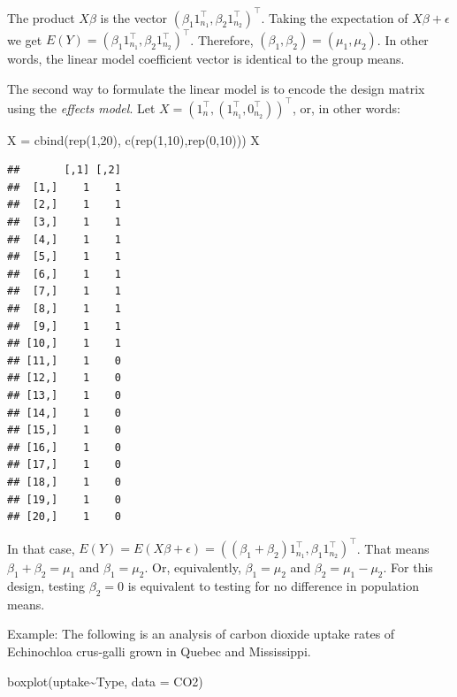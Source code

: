 \documentclass[
]{book}
\newenvironment{Shaded}{\begin{snugshade}}{\end{snugshade}}
\newcommand{\AttributeTok}[1]{\textcolor[rgb]{0.77,0.63,0.00}{#1}}
\newcommand{\DecValTok}[1]{\textcolor[rgb]{0.00,0.00,0.81}{#1}}
\newcommand{\FunctionTok}[1]{\textcolor[rgb]{0.00,0.00,0.00}{#1}}
\newcommand{\NormalTok}[1]{#1}
\newcommand{\OtherTok}[1]{\textcolor[rgb]{0.56,0.35,0.01}{#1}}
\newcommand{\SpecialCharTok}[1]{\textcolor[rgb]{0.00,0.00,0.00}{#1}}
\begin{document}
The product \(X\beta\) is the vector \((\beta_1 1_{n_1}^\top, \beta_2 1_{n_2}^\top)^\top\). Taking the expectation of \(X\beta + \epsilon\) we get \(E(Y) = (\beta_1 1_{n_1}^\top, \beta_2 1_{n_2}^\top)^\top\). Therefore, \((\beta_1, \beta_2) = (\mu_1, \mu_2)\). In other words, the linear model coefficient vector is identical to the group means.

The second way to formulate the linear model is to encode the design matrix using the \emph{effects model}. Let \(X = (1_n^\top, (1_{n_1}^\top, 0_{n_2}^\top))^\top\), or, in other words:

\begin{Shaded}
\begin{Highlighting}[]
\NormalTok{X }\OtherTok{=} \FunctionTok{cbind}\NormalTok{(}\FunctionTok{rep}\NormalTok{(}\DecValTok{1}\NormalTok{,}\DecValTok{20}\NormalTok{), }\FunctionTok{c}\NormalTok{(}\FunctionTok{rep}\NormalTok{(}\DecValTok{1}\NormalTok{,}\DecValTok{10}\NormalTok{),}\FunctionTok{rep}\NormalTok{(}\DecValTok{0}\NormalTok{,}\DecValTok{10}\NormalTok{)))}
\NormalTok{X}
\end{Highlighting}
\end{Shaded}

\begin{verbatim}
##       [,1] [,2]
##  [1,]    1    1
##  [2,]    1    1
##  [3,]    1    1
##  [4,]    1    1
##  [5,]    1    1
##  [6,]    1    1
##  [7,]    1    1
##  [8,]    1    1
##  [9,]    1    1
## [10,]    1    1
## [11,]    1    0
## [12,]    1    0
## [13,]    1    0
## [14,]    1    0
## [15,]    1    0
## [16,]    1    0
## [17,]    1    0
## [18,]    1    0
## [19,]    1    0
## [20,]    1    0
\end{verbatim}

In that case, \(E(Y) = E(X\beta+\epsilon) = ((\beta_1 + \beta_2)1_{n_1}^\top, \beta_1 1_{n_2}^\top)^\top\). That means \(\beta_1 + \beta_2 = \mu_1\) and \(\beta_1 = \mu_2\). Or, equivalently, \(\beta_1 = \mu_2\) and \(\beta_2 = \mu_1 - \mu_2\). For this design, testing \(\beta_2=0\) is equivalent to testing for no difference in population means.

Example: The following is an analysis of carbon dioxide uptake rates of Echinochloa crus-galli grown in Quebec and Mississippi.

\begin{Shaded}
\begin{Highlighting}[]
\FunctionTok{boxplot}\NormalTok{(uptake}\SpecialCharTok{\textasciitilde{}}\NormalTok{Type, }\AttributeTok{data =}\NormalTok{ CO2)}
\end{Highlighting}
\end{Shaded}
\end{document}
